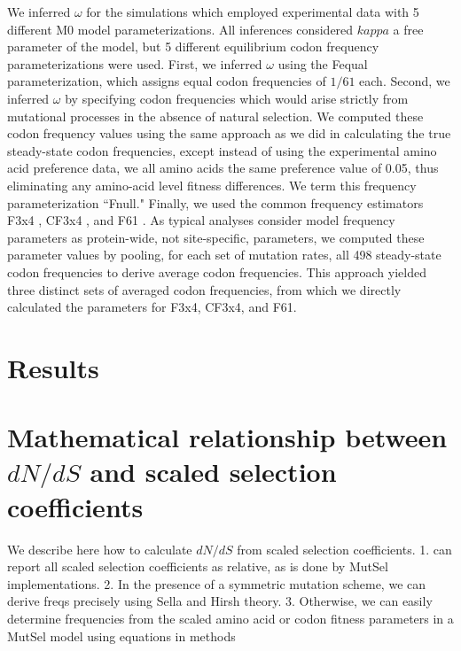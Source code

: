 \documentclass[11pt]{article}
\begin{document}
We inferred $\omega$ for the simulations which employed experimental data with 5 different M0 model parameterizations. All inferences considered $kappa$ a free parameter of the model, but 5 different equilibrium codon frequency parameterizations were used. First, we inferred $\omega$ using the Fequal \cite{Yang2006} parameterization, which assigns equal codon frequencies of $1/61$ each. Second, we inferred $\omega$ by specifying codon frequencies which would arise strictly from mutational processes in the absence of natural selection. We computed these codon frequency values using the same approach as we did in calculating the true steady-state codon frequencies, except instead of using the experimental amino acid preference data, we all amino acids the same preference value of 0.05, thus eliminating any amino-acid level fitness differences. We term this frequency parameterization ``Fnull." Finally, we used the common frequency estimators F3x4 \cite{MuseGaut1994}, CF3x4 \cite{Pond2010}, and F61 \cite{GoldmanYang1994}. As typical analyses consider model frequency parameters as protein-wide, not site-specific, parameters, we computed these parameter values by pooling, for each set of mutation rates, all 498 steady-state codon frequencies to derive average codon frequencies. This approach yielded three distinct sets of averaged codon frequencies, from which we directly calculated the parameters for F3x4, CF3x4, and F61.








\section*{Results}


\section*{Mathematical relationship between $dN/dS$ and scaled selection coefficients}


We describe here how to calculate $dN/dS$ from scaled selection coefficients. 
1. can report all scaled selection coefficients as relative, as is done by MutSel implementations.
2. In the presence of a symmetric mutation scheme, we can derive freqs precisely using Sella and Hirsh theory.
3. Otherwise, we can easily determine frequencies from the scaled amino acid or codon fitness parameters in a MutSel model using equations in methods
\end{document}
